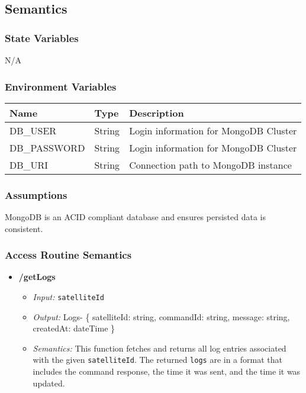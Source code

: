 \documentclass[12pt, titlepage]{article}
\begin{document}
\subsection{ Semantics}

\subsubsection{ State Variables}

N/A

\subsubsection{ Environment Variables}

\begin{center}
\begin{tabular}{p{4cm} p{4cm} p{4cm}}
\hline
\textbf{Name} & \textbf{Type} & \textbf{Description} \\
\hline
DB\_USER & String& Login information for MongoDB Cluster \\
\hline
DB\_PASSWORD & String & Login information for MongoDB Cluster \\
\hline
DB\_URI & String & Connection path to MongoDB instance \\
\hline
\end{tabular}
\end{center}

\subsubsection{ Assumptions}

MongoDB is an ACID compliant database and ensures persisted data is consistent.

\subsubsection{ Access Routine Semantics}

\begin{itemize}
  \item \textbf{/getLogs}
  \begin{itemize}
    \item \textit{Input:} \texttt{satelliteId}
    \item \textit{Output:} Logs- \{ satelliteId: string, commandId: string, message: string, createdAt: dateTime \}
    \item \textit{Semantics:} This function fetches and returns all log entries associated with the given \texttt{satelliteId}. The returned \texttt{logs} are in a format that includes the command response, the time it was sent, and the time it was updated.
  \end{itemize}
\end{itemize}
\end{document}
